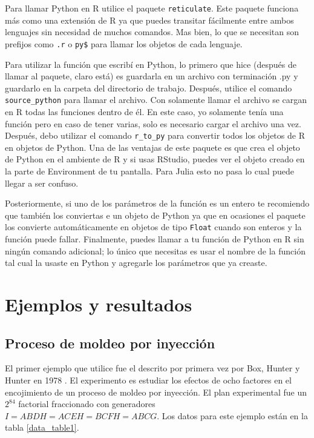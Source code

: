 Para llamar Python en R utilice el paquete \texttt{reticulate}. Este paquete funciona más como una extensión de R ya que puedes transitar fácilmente entre ambos lenguajes sin necesidad de muchos comandos. Mas bien, lo que se necesitan son prefijos como \texttt{.r} o \texttt{py\$} para llamar los objetos de cada lenguaje.

Para utilizar la función que escribí en Python, lo primero que hice (después de llamar al paquete, claro está) es guardarla en un archivo con terminación \textsf{.py} y guardarlo en la carpeta del directorio de trabajo. Después, utilice el comando \texttt{source\_python} para llamar el archivo. Con solamente llamar el archivo se cargan en R todas las funciones dentro de él. En este caso, yo solamente tenía una función pero en caso de tener varias, solo es necesario cargar el archivo una vez. Después, debo utilizar el comando \texttt{r\_to\_py} para convertir todos los objetos de R en objetos de Python. Una de las ventajas de este paquete es que crea el objeto de Python en el ambiente de R y si usas RStudio, puedes ver el objeto creado en la parte de \textsf{Environment} de tu pantalla. Para Julia esto no pasa lo cual puede llegar a ser confuso. 

Posteriormente, si uno de los parámetros de la función es un entero te recomiendo que también los conviertas e un objeto de Python ya que en ocasiones el paquete los convierte automáticamente en objetos de tipo \texttt{Float} cuando son enteros y la función puede fallar. Finalmente, puedes llamar a tu función de Python en R sin ningún comando adicional; lo único que necesitas es usar el nombre de la función tal cual la usaste en Python y agregarle los parámetros que ya creaste. 

\section{Ejemplos y resultados}

\subsection{Proceso de moldeo por inyección}

El primer ejemplo que utilice fue el descrito por primera vez por Box, Hunter y Hunter en 1978 . El experimento es estudiar los efectos de ocho factores en el encojimiento de un proceso de moldeo por inyección. El plan experimental fue un $2^{84}$ factorial fraccionado con generadores $I = ABDH = ACEH = BCFH = ABCG$. Los datos para este ejemplo están en la tabla \ref{data_table1}. 

